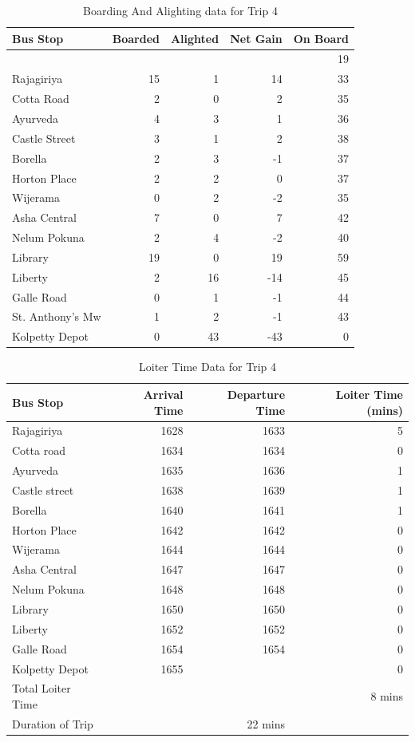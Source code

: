 \documentclass[12pt, oneside]{report}
\begin{document}
\begin{table}
\centering
\begin{tabular}{|l|r|r|r|r|}
\hline
Bus Stop & Boarded & Alighted & Net Gain & On Board \\
\hline
 & & & & 19 \\
Rajagiriya	&15	&1	&14	&33\\
Cotta Road	&2	&0	&2	&35\\
Ayurveda	&4	&3	&1	&36\\
Castle Street	&3	&1	&2	&38\\
Borella	&2	&3	&-1	&37\\
Horton Place	&2	&2	&0	&37\\
Wijerama	&0	&2	&-2	&35\\
Asha Central	&7	&0	&7	&42\\
Nelum Pokuna	&2	&4	&-2	&40\\
Library	&19	&0	&19	&59\\
Liberty	&2	&16	&-14	&45\\
Galle Road	&0	&1	&-1	&44\\
\rowcolor[gray]{0.7}
St. Anthony's Mw	&1	&2	&-1	&43\\
Kolpetty Depot	&0	&43	&-43	&0\\
\hline
\end{tabular}
\caption{Boarding And Alighting data for Trip 4}
\label{table-trip4-BoardingAndAlighting}
\end{table}

\begin{table}
\centering
\begin{tabular}{|l|r|r|r|}
\hline
Bus Stop & Arrival Time & Departure Time & Loiter Time (mins) \\
\hline
Rajagiriya	&1628	&1633	&5\\
Cotta road	&1634	&1634	&0\\
Ayurveda	&1635	&1636	&1\\
Castle street	&1638	&1639	&1\\
Borella	&1640	&1641	&1\\
Horton Place	&1642	&1642	&0\\
Wijerama	&1644	&1644	&0\\
Asha Central	&1647	&1647	&0\\
Nelum Pokuna	&1648	&1648	&0\\
Library	&1650	&1650	&0\\
Liberty	&1652	&1652	&0\\
Galle Road	&1654	&1654	&0\\
Kolpetty Depot	&1655	&	&0\\
\hline
Total Loiter Time & & & 8 mins \\
Duration of Trip & & 22 mins & \\
\hline
\end{tabular}
\caption{Loiter Time Data for Trip 4}
\label{table-trip4-LoiterTime}
\end{table}
\end{document}
